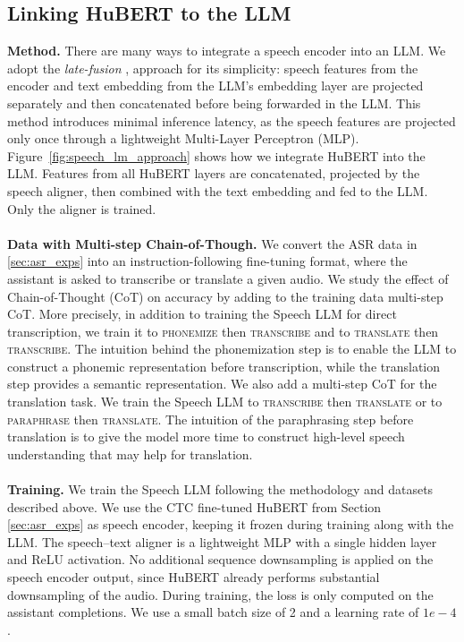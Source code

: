 \documentclass{article}
\newcommand{\myparagraph}[1]{\noindent\textbf{#1}}
\begin{document}
\subsection{Linking HuBERT to the LLM}
\myparagraph{Method.} There are many ways to integrate a speech encoder into an LLM. We adopt the \textit{late-fusion} \cite{llava, llamaspeech}, approach for its simplicity: speech features from the encoder and text embedding from the LLM's embedding layer are projected separately and then concatenated before being forwarded in the LLM. This method introduces minimal inference latency, as the speech features are projected only once through a lightweight Multi-Layer Perceptron (MLP). Figure~\ref{fig:speech_lm_approach} shows how we integrate HuBERT into the LLM. Features from all HuBERT layers are concatenated, projected by the speech aligner, then combined with the text embedding and fed to the LLM. Only the aligner is trained.
\\
\\
\myparagraph{Data with Multi-step Chain-of-Though.} We convert the ASR data in \ref{sec:asr_exps} into an instruction-following fine-tuning format, where the assistant is asked to transcribe or translate a given audio. We study the effect of Chain-of-Thought (CoT) on accuracy by adding to the training data multi-step CoT. More precisely, in addition to training the Speech LLM for direct transcription, we train it to \textsc{phonemize} then \textsc{transcribe} and to \textsc{translate} then \textsc{transcribe}. The intuition behind the phonemization step is to enable the LLM to construct a phonemic representation before transcription, while the translation step provides a semantic representation. We also add a multi-step CoT for the translation task. We train the Speech LLM to \textsc{transcribe} then \textsc{translate} or to \textsc{paraphrase} then \textsc{translate}. The intuition of the paraphrasing step before translation is to give the model more time to construct high-level speech understanding that may help for translation.
\\
\\
\myparagraph{Training.} We train the Speech LLM following the methodology and datasets described above. We use the CTC fine-tuned HuBERT from Section \ref{sec:asr_exps} as speech encoder, keeping it frozen during training along with the LLM. The speech–text aligner is a lightweight MLP with a single hidden layer and ReLU activation. No additional sequence downsampling is applied on the speech encoder output, since HuBERT already performs substantial downsampling of the audio. During training, the loss is only computed on the assistant completions. We use a small batch size of 2 and a learning rate of $1e-4$.
\end{document}
